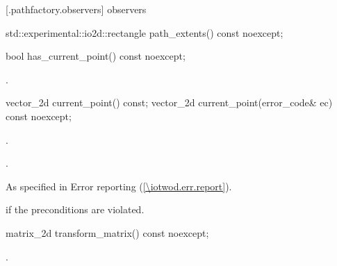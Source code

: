  [\iotwod.pathfactory.observers] { observers}

\begin{itemdecl}
    std::experimental::io2d::rectangle path_extents() const noexcept;
\end{itemdecl}
\begin{itemdescr}
	\pnum
	\returns

\end{itemdescr}

\begin{itemdecl}
    bool has_current_point() const noexcept;
\end{itemdecl}
\begin{itemdescr}
	\pnum
	\returns
	.

\end{itemdescr}

\begin{itemdecl}
    vector_2d current_point() const;
    vector_2d current_point(error_code& ec) const noexcept;
\end{itemdecl}
\begin{itemdescr}
	\pnum
	\preconditions
	.
	
	\pnum
	\returns
	.

	\pnum
	\throws
	As specified in Error reporting (\ref{\iotwod.err.report}).

	\pnum
	\errors
	\pnum
	 if the preconditions are violated.
	
\end{itemdescr}

\begin{itemdecl}
    matrix_2d transform_matrix() const noexcept;
\end{itemdecl}
\begin{itemdescr}
	\pnum
	\returns
	.

\end{itemdescr}

